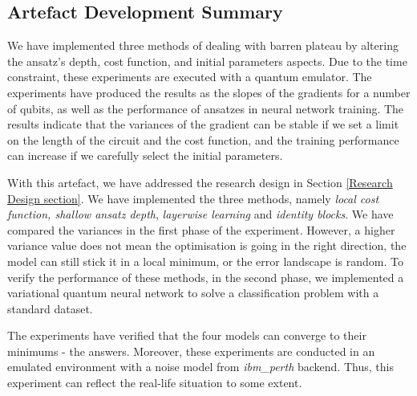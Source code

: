 \subsection{Artefact Development Summary}

We have implemented three methods of dealing with barren plateau by altering the ansatz's depth, cost function, and initial parameters aspects.
Due to the time constraint, these experiments are executed with a quantum emulator.
The experiments have produced the results as the slopes of the gradients for a number of qubits, as well as the performance of ansatzes in neural network training.
The results indicate that the variances of the gradient can be stable if we set a limit on the length of the circuit and the cost function, and the training performance can increase if we carefully select the initial parameters.

With this artefact, we have addressed the research design in Section \ref{Research Design section}.
We have implemented the three methods, namely \textit{local cost function, shallow ansatz depth}, \textit{layerwise learning} and \textit{identity blocks}.
We have compared the variances in the first phase of the experiment.
However, a higher variance value does not mean the optimisation is going in the right direction, the model can still stick it in a local minimum, or the error landscape is random.
To verify the performance of these methods, in the second phase, we implemented a variational quantum neural network to solve a classification problem with a standard dataset.

The experiments have verified that the four models can converge to their minimums - the answers.
Moreover, these experiments are conducted in an emulated environment with a noise model from \emph{ibm\_perth} backend.
Thus, this experiment can reflect the real-life situation to some extent.

